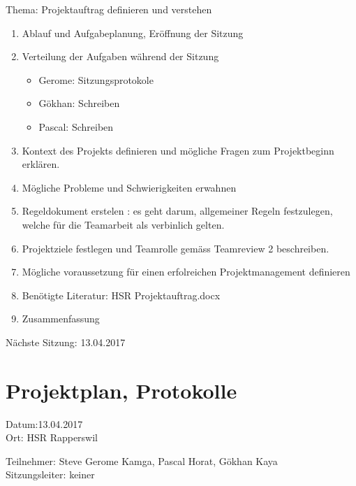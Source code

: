 Thema: Projektauftrag definieren und verstehen
\begin{enumerate}

\item Ablauf und Aufgabeplanung, Eröffnung der Sitzung 

\item  Verteilung der Aufgaben während der Sitzung
\begin{itemize}
\item Gerome: Sitzungsprotokole
\item Gökhan: Schreiben
\item Pascal: Schreiben 
\end{itemize}

\item Kontext des Projekts definieren und mögliche Fragen zum Projektbeginn erklären.

\item Mögliche Probleme und Schwierigkeiten erwahnen

\item Regeldokument erstelen : es geht darum, allgemeiner Regeln festzulegen, welche für die Teamarbeit als verbinlich gelten.

\item Projektziele festlegen und Teamrolle gemäss Teamreview 2 beschreiben.

\item Mögliche voraussetzung für einen erfolreichen Projektmanagement definieren

\item Benötigte Literatur: HSR Projektauftrag.docx   

\item Zusammenfassung

\end{enumerate}

Nächste Sitzung: 13.04.2017




\newpage

\section*{Projektplan, Protokolle}

Datum:13.04.2017\\
Ort: HSR Rapperswil

Teilnehmer: Steve Gerome Kamga, Pascal Horat, Gökhan Kaya\\
Sitzungsleiter: keiner

